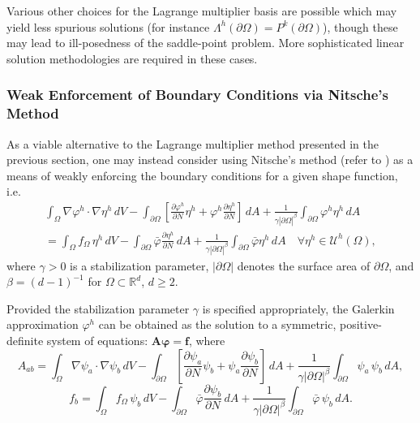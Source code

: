 	Various other choices for the Lagrange multiplier basis are possible which may yield less spurious solutions (for instance $\Lambda^h (\partial \Omega) = P^{k} (\partial \Omega)$), though these may lead to ill-posedness of the saddle-point problem. More sophisticated linear solution methodologies are required in these cases.

	\subsubsection*{Weak Enforcement of Boundary Conditions via Nitsche's Method}
	
	As a viable alternative to the Lagrange multiplier method presented in the previous section, one may instead consider using Nitsche's method (refer to \cite{Juntunen&Stenberg:09}) as a means of weakly enforcing the boundary conditions for a given shape function, i.e.
	\begin{eqnarray}
		\int_{\Omega} \nabla \varphi^h \cdot \nabla \eta^h \, dV - \int_{\partial \Omega} \left[ \frac{\partial \varphi^h}{\partial N} \eta^h + \varphi^h \frac{\partial \eta^h}{\partial N} \right] \, dA + \frac{1}{\gamma |\partial \Omega|^{\beta}} \int_{\partial \Omega} \varphi^h \eta^h \, dA \nonumber \\ = \int_\Omega f_\Omega \, \eta^h \, dV - \int_{\partial \Omega} \bar{\varphi} \frac{\partial \eta^h}{\partial N} \, dA + \frac{1}{\gamma |\partial \Omega|^{\beta}} \int_{\partial \Omega} \bar{\varphi} \eta^h \, dA \quad \forall \eta^h \in \mathcal{U}^h (\Omega),
	\end{eqnarray}
	where $\gamma > 0$ is a stabilization parameter, $| \partial \Omega |$ denotes the surface area of $\partial \Omega$, and $\beta = (d-1)^{-1}$ for $\Omega \subset \mathbb{R}^d$, $d \geq 2$.
	
	Provided the stabilization parameter $\gamma$ is specified appropriately, the Galerkin approximation $\varphi^h$ can be obtained as the solution to a symmetric, positive-definite system of equations: $\mathbf{A} \boldsymbol{\varphi} = \mathbf{f}$, where
	\begin{equation}
		A_{ab} = \int_{\Omega} \nabla \psi_a \cdot \nabla \psi_b \, dV - \int_{\partial \Omega} \left[ \frac{\partial \psi_a}{\partial N} \psi_b + \psi_a \frac{\partial \psi_b}{\partial N} \right] \, dA + \frac{1}{\gamma |\partial \Omega|^{\beta}} \int_{\partial \Omega} \psi_a \, \psi_b \, dA,
	\end{equation}
	\begin{equation}
		f_{b} = \int_{\Omega} f_\Omega \, \psi_b \, dV - \int_{\partial \Omega} \bar{\varphi} \frac{\partial \psi_b}{\partial N} \, dA + \frac{1}{\gamma |\partial \Omega|^{\beta}} \int_{\partial \Omega} \bar{\varphi} \, \psi_b \, dA.
	\end{equation}
	
